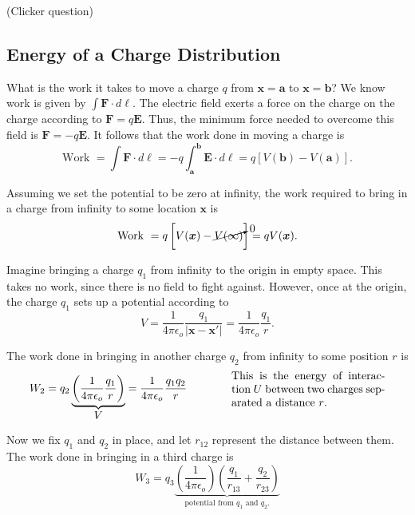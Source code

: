 \documentclass{article}
\numberwithin{equation}{section}
\begin{document}
(Clicker question) \\

\subsection*{Energy of a Charge Distribution}

What is the work it takes to move a charge $q$ from $\bm{x} = \bm{a}$ to $\bm{x} = \bm{b}$? We know work is given by $\displaystyle \int \bm{F} \cdot d\bm{\ell}$. The electric field exerts a force on the charge on the charge according to $\bm{F} = q\bm{E}$. Thus, the minimum force needed to overcome this field is $\bm{F} = -q\bm{E}$. It follows that the work done in moving a charge is
\begin{equation*}
    \text{Work } = \int \bm{F} \cdot d\bm{\ell} = -q \int_{\bm{a}}^{\bm{b}} \bm{E} \cdot d\bm{\ell} = q \left[ V(\bm{b}) - V(\bm{a}) \right].
\end{equation*}

Assuming we set the potential to be zero at infinity, the work required to bring in a charge from infinity to some location $\bm{x}$ is
\begin{equation*}
    \text{Work } = q \left[ V(\bm{x}) - \cancelto{0}{V(\infty)} \right] = q V(\bm{x}).
\end{equation*}

Imagine bringing a charge $q_1$ from infinity to the origin in empty space. This takes no work, since there is no field to fight against. However, once at the origin, the charge $q_1$ sets up a potential according to
\begin{equation*}
    V = \frac{1}{4\pi\epsilon_o} \frac{q_1}{\left| \bm{x} - \bm{x'} \right|} = \frac{1}{4\pi\epsilon_o} \frac{q_1}{r}.
\end{equation*}

The work done in bringing in another charge $q_2$ from infinity to some position $r$ is
\begin{equation*}
    W_{2} = q_2 \underbrace{\left( \frac{1}{4\pi\epsilon_o} \frac{q_1}{r} \right)}_{\displaystyle V} = \frac{1}{4\pi\epsilon_o} \frac{q_1 q_2}{r} \qquad\qquad \parbox[c]{0.4\textwidth}{This is the energy of interaction $U$ between two charges separated a distance $r$.}
\end{equation*}

Now we fix $q_1$ and $q_2$ in place, and let $r_{12}$ represent the distance between them. The work done in bringing in a third charge is
\begin{equation*}
    W_3 = q_3 \underbrace{\left( \frac{1}{4\pi\epsilon_o} \right) \left( \frac{q_1}{r_{13}} + \frac{q_2}{r_{23}} \right)}_{\displaystyle \text{potential from } q_1 \text{ and } q_2.}
\end{equation*}
\end{document}
